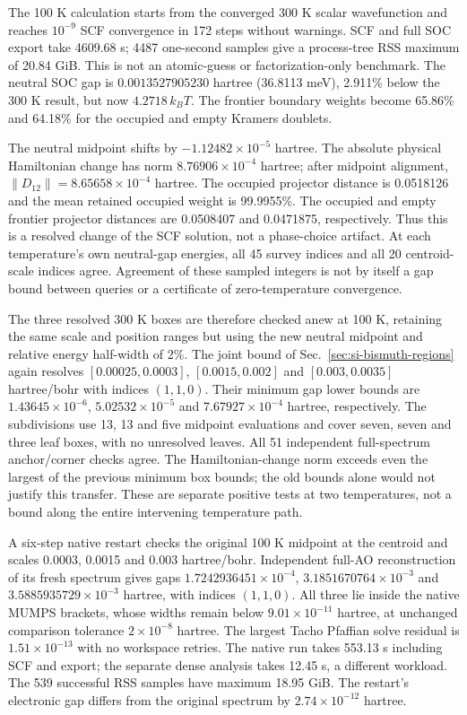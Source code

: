 \documentclass[11pt]{article}
\begin{document}
The 100 K calculation starts from the converged 300 K scalar
wavefunction and reaches $10^{-9}$ SCF convergence in 172 steps
without warnings. SCF and full SOC export take 4609.68 s;
4487 one-second samples give a process-tree RSS maximum of
20.84 GiB. This is not an atomic-guess or factorization-only
benchmark. The neutral SOC gap is $0.0013527905230$ hartree
(36.8113 meV), 2.911\% below the 300 K result, but now
$4.2718\,k_BT$. The frontier boundary weights become 65.86\%
and 64.18\% for the occupied and empty Kramers doublets.

The neutral midpoint shifts by $-1.12482\times10^{-5}$ hartree.
The absolute physical Hamiltonian change has norm
$8.76906\times10^{-4}$ hartree; after midpoint alignment,
$\|D_{12}\|=8.65658\times10^{-4}$ hartree. The occupied
projector distance is 0.0518126 and the mean retained occupied
weight is 99.9955\%. The occupied and empty frontier projector
distances are 0.0508407 and 0.0471875, respectively. Thus this is
a resolved change of the SCF solution, not a phase-choice artifact.
At each temperature's own neutral-gap energies, all 45 survey
indices and all 20 centroid-scale indices agree. Agreement of
these sampled integers is not by itself a gap bound between
queries or a certificate of zero-temperature convergence.

The three resolved 300 K boxes are therefore checked anew at
100 K, retaining the same scale and position ranges but using
the new neutral midpoint and relative energy half-width of 2\%.
The joint bound of Sec.~\ref{sec:si-bismuth-regions} again resolves
$[0.00025,0.0003]$, $[0.0015,0.002]$ and $[0.003,0.0035]$
hartree/bohr with indices $(1,1,0)$. Their minimum gap lower
bounds are $1.43645\times10^{-6}$, $5.02532\times10^{-5}$ and
$7.67927\times10^{-4}$ hartree, respectively. The subdivisions
use 13, 13 and five midpoint evaluations and cover seven, seven
and three leaf boxes, with no unresolved leaves. All 51 independent
full-spectrum anchor/corner checks agree. The Hamiltonian-change
norm exceeds even the largest of the previous minimum box bounds;
the old bounds alone would not justify this transfer. These are
separate positive tests at two temperatures, not a bound along
the entire intervening temperature path.

A six-step native restart checks the original 100 K midpoint
at the centroid and scales 0.0003, 0.0015 and 0.003 hartree/bohr.
Independent full-AO reconstruction of its fresh spectrum gives gaps
$1.7242936451\times10^{-4}$, $3.1851670764\times10^{-3}$ and
$3.5885935729\times10^{-3}$ hartree, with indices $(1,1,0)$.
All three lie inside the native MUMPS brackets, whose widths
remain below $9.01\times10^{-11}$ hartree, at unchanged comparison
tolerance $2\times10^{-8}$ hartree. The largest Tacho Pfaffian
solve residual is $1.51\times10^{-13}$ with no workspace retries.
The native run takes 553.13 s including SCF and export; the separate
dense analysis takes 12.45 s, a different workload. The 539 successful
RSS samples have maximum 18.95 GiB. The restart's electronic gap
differs from the original spectrum by $2.74\times10^{-12}$ hartree.
\end{document}
